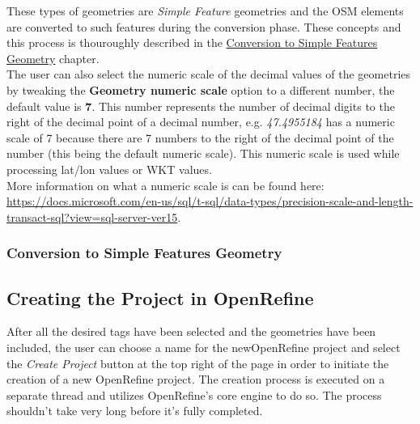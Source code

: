 These types of geometries are \textit{Simple Feature} geometries and the OSM elements are converted to such
features during the conversion phase. These concepts and this process is thouroughly described in the
\hyperref[sec:conversion-to-simple-features-geometry]{Conversion to Simple Features Geometry} chapter.\\
\newline
The user can also select the numeric scale of the decimal values of the geometries by tweaking the \textbf{Geometry numeric scale}
option to a different number, the default value is \textbf{7}. This number represents the number of decimal digits to the right
of the decimal point of a decimal number, e.g. \textit{47.4955184} has a numeric scale of 7 because there are 7 numbers to
the right of the decimal point of the number (this being the default numeric scale). This numeric scale is used
while processing lat/lon values or WKT values. \\
\newline
More information on what a numeric scale is can be found here:
\href{https://docs.microsoft.com/en-us/sql/t-sql/data-types/precision-scale-and-length-transact-sql?view=sql-server-ver15}{https://docs.microsoft.com/en-us/sql/t-sql/data-types/precision-scale-and-length-transact-sql?view=sql-server-ver15}.
\subsubsection{Conversion to Simple Features Geometry}\label{sec:conversion-to-simple-features-geometry}
\lipsum[21-23]
\subsection{Creating the Project in OpenRefine}
After all the desired tags have been selected and the geometries have been included, the user can choose a
name for the newOpenRefine project and select the \textit{Create Project} button at the top right of the
page in order to initiate the creation of a new OpenRefine project.
The creation process is executed on a separate thread and utilizes OpenRefine's core engine to do so.
The process shouldn't take very long before it's fully completed.

